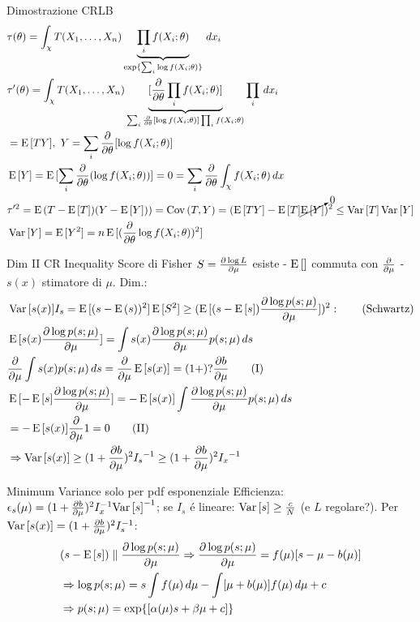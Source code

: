 \documentclass[asd-beamer.tex]{subfiles}
\begin{document}
\begin{frame}[t]{Dimostrazione CRLB}
	\begin{align*}
	&\tau(\theta)=\int_{\chi}T(X_1,\ldots,X_n)\underbrace{\prod_if(X_i;\theta)}_{\text{exp}\{\sum_i\log{f(X_i;\theta)}\}}\,dx_i\\
	&\tau'(\theta)=\int_{\chi}T(X_1,\ldots,X_n)\underbrace{[\frac{\partial}{\partial \theta}\prod_if(X_i;\theta)]}_{\sum_i\frac{\partial}{\partial \theta}[\log{f(X_i;\theta)}]\prod_if(X_i;\theta)}\prod_i\,dx_i\\
	&=\operatorname{E}{[TY]},\ Y=\sum_i\frac{\partial}{\partial \theta}[\log{f(X_i;\theta)}]\\
	&\operatorname{E}{[Y]}=\operatorname{E}{[\sum_i\frac{\partial}{\partial \theta}(\log{f(X_i;\theta)})]}=0=\sum_i\frac{\partial}{\partial \theta}\int_{\chi}f(X_i;\theta)\,dx\\
	&\tau'^2=\operatorname{E}{(T-\operatorname{E}{[T]})(Y-\operatorname{E}{[Y]}))}=\operatorname{Cov}{(T,Y)}=(\operatorname{E}{[TY]}-\operatorname{E}{[T]}\cancelto{0}{\operatorname{E}{[Y]}})^2\leq \operatorname{Var}{[T]}\operatorname{Var}{[Y]}\\
	&\operatorname{Var}{[Y]}=\operatorname{E}{[Y^2]}=n\operatorname{E}{[(\frac{\partial}{\partial \theta}\log{f(X_i;\theta)})^2]}
	\end{align*}
\end{frame}

\begin{frame}{Dim II CR Inequality}
Score di Fisher $S=\frac{\partial \log{L}}{\partial \mu}$ esiste - $\operatorname{E}{[]}$ commuta con $\frac{\partial}{\partial \mu}$ - $s(x)$ stimatore di $\mu$.
Dim.:
\begin{align*}
&\operatorname{Var}{[s(x)]}I_s=\operatorname{E}{[(s-\operatorname{E}{(s)})^2]}\operatorname{E}{[S^2]}\geq(\operatorname{E}{[(s-\operatorname{E}{[s]})\frac{\partial \log{p(s;\mu)}}{\partial \mu}]})^2:\tag{Schwartz}\\
&\operatorname{E}{[s(x)\frac{\partial \log{p(s;\mu)}}{\partial \mu}]}=\int s(x)\frac{\partial \log{p(s;\mu)}}{\partial \mu}p(s;\mu)\,ds\\
&\frac{\partial}{\partial \mu}\int s(x)p(s;\mu)\,ds=\frac{\partial}{\partial \mu}\operatorname{E}{[s(x)]}=(1+)?\frac{\partial b}{\partial \mu}\tag{I}\\
&\operatorname{E}{[-\operatorname{E}{[s]}\frac{\partial \log{p(s;\mu)}}{\partial \mu}]}=-\operatorname{E}{[s(x)]}\int\frac{\partial \log{p(s;\mu)}}{\partial \mu}p(s;\mu)\,ds\\
&=-\operatorname{E}{[s(x)]}\frac{\partial}{\partial \mu}1=0\tag{II}\\
&\Rightarrow\operatorname{Var}{[s(x)]}\geq(1+\frac{\partial b}{\partial \mu})^2{I_s}^{-1}\geq(1+\frac{\partial b}{\partial \mu})^2{I_x}^{-1}
\end{align*}
\end{frame}

\begin{frame}{Minimum Variance solo per pdf esponenziale}
Efficienza: $\epsilon_s(\mu)=(1+\frac{\partial b}{\partial \mu})^2{I}^{-1}_x{\operatorname{Var}{}[s]}^{-1}$; se $I_s$ \'e lineare: $\operatorname{Var}{[s]}\geq\frac{c}{N}$ (e $L$ regolare?).
Per $\operatorname{Var}{[s(x)]}=(1+\frac{\partial b}{\partial \mu})^2{I}^{-1}_s$:
\begin{align*}
&(s-\operatorname{E}{[s]})\parallel\frac{\partial \log{p(s;\mu)}}{\partial \mu}\Rightarrow\frac{\partial \log{p(s;\mu)}}{\partial \mu}=f(\mu)[s-\mu-b(\mu)]\\
&\Rightarrow\log{p(s;\mu)}=s\int f(\mu)\,d\mu-\int[\mu+b(\mu)]f(\mu)\,d\mu+c\\
&\Rightarrow p(s;\mu)=\text{exp}\{[\alpha(\mu)s+\beta\mu+c]\}
\end{align*}
\end{frame}
\end{document}
